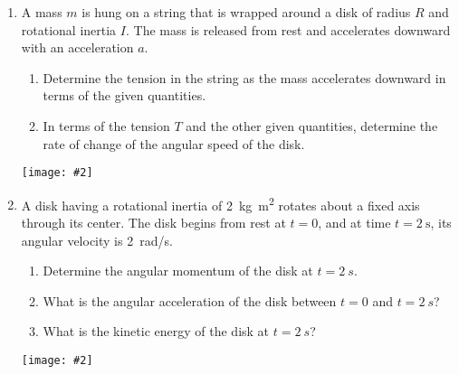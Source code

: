 \documentclass[12pt]{article}
\newcommand{\pic}[2]{\texttt{[image: \#2]}}
\begin{document}
\begin{enumerate}[leftmargin=15pt]
\item A mass $m$ is hung on a string that is wrapped around a disk of radius
  $R$ and rotational inertia $I$. The mass is released from rest and
  accelerates downward with an acceleration $a$.
  \begin{enumerate}[noitemsep]
  \item Determine the tension in the string as the mass accelerates downward
    in terms of the given quantities.
  \item In terms of the tension $T$ and the other given quantities, determine
    the rate of change of the angular speed of the disk.
  \end{enumerate}
  \pic{.3}{mass-disk.png}
  \vspace{0.5in}
  
\item A disk having a rotational inertia of \SI{2}{kg.m^2} rotates about a
  fixed axis through its center. The disk begins from rest at $t=0$, and at
  time $t=\SI{2}{\s}$, its angular velocity is \SI{2}{rad/s}.
  \begin{enumerate}[noitemsep]
  \item Determine the angular momentum of the disk at $t=\SI{2}{s}$.
  \item What is the angular acceleration of the disk between $t=0$ and
    $t=\SI{2}{s}$?
  \item What is the kinetic energy of the disk at $t=\SI{2}{s}$?
  \end{enumerate}
  \pic{0.3}{rotDisk.png}
\end{enumerate}
\end{document}
